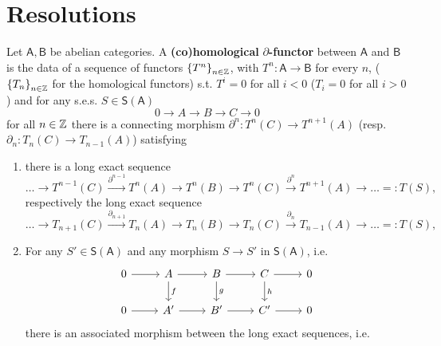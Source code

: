 \section{Resolutions}

\begin{defn}
	Let $\mathsf{A}, \mathsf{B}$ be abelian categories.
	A \textbf{(co)homological} $\partial$\textbf{-functor} between $\mathsf{A}$ and $\mathsf{B}$
	is the data of a sequence of functors $\left\{ T^n \right\}_{n \in \mathbb{Z}}$, with
	$T^n: \mathsf{A} \to \mathsf{B}$ for every $n$,
	($\left\{ T_n \right\}_{n \in \mathbb{Z}}$ for the homological functors)
	s.t. $T^i = 0$ for all $i < 0$ ($T_i = 0$ for all $i > 0$)
	and for any s.e.s. $S \in \mathsf{S}(\mathsf{A})$
	\begin{equation}
	0 \to A \to B \to C \to 0
	\end{equation} 
	for all $n \in \mathbb{Z}$ there is a connecting morphism
	$\partial^n: T^n(C) \to T^{n+1}(A)$ (resp. $\partial_n: T_n(C) \to T_{n-1}(A)$)
	satisfying
	\begin{enumerate}
		\item there is a long exact sequence
			\begin{equation}
				\ldots \to T^{n-1}(C) \xrightarrow{\partial^{n-1}} T^n(A) \to
				T^n(B) \to T^n(C) \xrightarrow{\partial^n} T^{n+1}(A) \to
				\ldots =: T(S)
			,\end{equation} 
			respectively the long exact sequence
			\begin{equation}
				\ldots \to T_{n+1}(C) \xrightarrow{\partial_{n+1}} T_n(A) \to
				T_n(B) \to T_n(C) \xrightarrow{\partial_n} T_{n-1}(A) \to
				\ldots =: T(S)
			,\end{equation} 
		\item For any $S' \in \mathsf{S}(\mathsf{A})$ and any morphism
			$S \to S'$ in $\mathsf{S}(\mathsf{A})$, i.e.
			\begin{equation}
			\begin{tikzcd}
				0 \arrow[r, "", rightarrow] &
				A \arrow[r, "", rightarrow] \arrow[d, "f", rightarrow] &
				B \arrow[r, "", rightarrow] \arrow[d, "g", rightarrow] &
				C \arrow[r, "", rightarrow] \arrow[d, "h", rightarrow] &
				0 \\
				0 \arrow[r, "", rightarrow] &
				A' \arrow[r, "", rightarrow] &
				B' \arrow[r, "", rightarrow] &
				C' \arrow[r, "", rightarrow] &
				0 
			\end{tikzcd}
			\end{equation} 
			there is an associated morphism between the long exact sequences, i.e.

\end{enumerate}
\end{defn}
